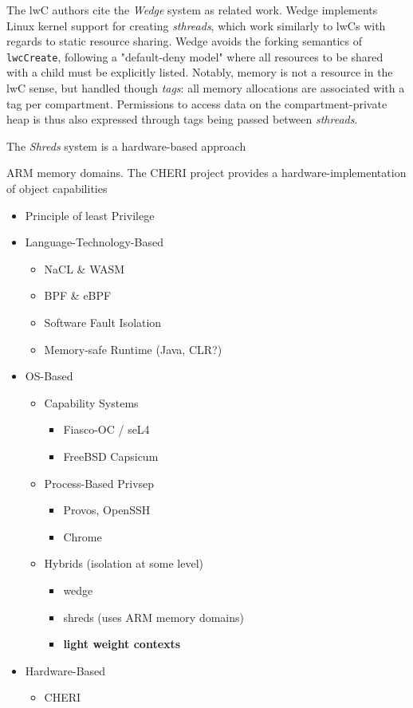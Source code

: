 \documentclass[10pt,twocolumn,letter]{article}
\begin{document}
The lwC authors cite the \textit{Wedge} system as related work.
Wedge implements Linux kernel support for creating \textit{sthreads}, which work similarly to lwCs with regards to static resource sharing.
Wedge avoids the forking semantics of \lstinline{lwcCreate}, following a "default-deny model" where all resources to be shared with a child must be explicitly listed.
Notably, memory is not a resource in the lwC sense, but handled though \textit{tags}: all memory allocations are associated with a tag per compartment.
Permissions to access data on the compartment-private heap is thus also expressed through tags being passed between \textit{sthreads}.
\cite{bittau2008wedge}

The \textit{Shreds} system is a hardware-based approach

ARM memory domains.
The CHERI project provides a hardware-implementation of object capabilities

\begin{itemize}
  \item Principle of least Privilege
  
  \item Language-Technology-Based
  \begin{itemize}
    \item NaCL \& WASM
    \item BPF \& eBPF
    \item Software Fault Isolation
    \item Memory-safe Runtime (Java, CLR?) %
  \end{itemize}
  
  \item OS-Based
    \begin{itemize}
      \item Capability Systems
      \begin{itemize}
        \item Fiasco-OC / seL4
        \item FreeBSD Capsicum
      \end{itemize}
      \item Process-Based Privsep
      \begin{itemize}
        \item Provos, OpenSSH
        \item Chrome
      \end{itemize}
      \item Hybrids (isolation at some level)
      \begin{itemize}
        \item wedge
        \item shreds (uses ARM memory domains)
        \item \textbf{light weight contexts}
      \end{itemize}
    \end{itemize}

  \item Hardware-Based
  \begin{itemize}
    \item CHERI
  \end{itemize}
\end{itemize}
\end{document}
